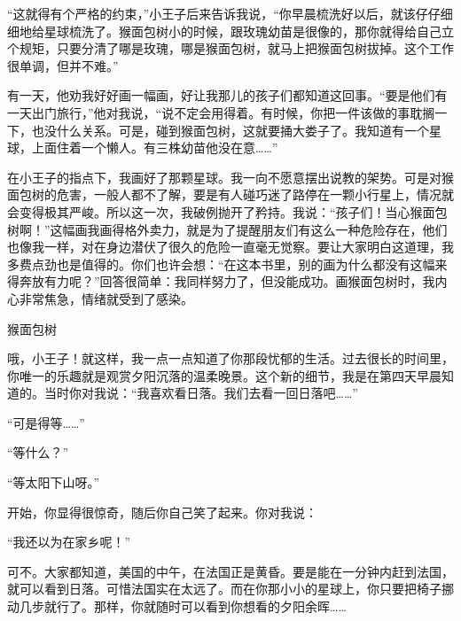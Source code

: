 “这就得有个严格的约束，”小王子后来告诉我说，“你早晨梳洗好以后，就该仔仔细细地给星球梳洗了。猴面包树小的时候，跟玫瑰幼苗是很像的，那你就得给自己立个规矩，只要分清了哪是玫瑰，哪是猴面包树，就马上把猴面包树拔掉。这个工作很单调，但并不难。”

有一天，他劝我好好画一幅画，好让我那儿的孩子们都知道这回事。“要是他们有一天出门旅行，”他对我说，“说不定会用得着。有时候，你把一件该做的事耽搁一下，也没什么关系。可是，碰到猴面包树，这就要捅大娄子了。我知道有一个星球，上面住着一个懒人。有三株幼苗他没在意\ldots{}\ldots{}”

在小王子的指点下，我画好了那颗星球。我一向不愿意摆出说教的架势。可是对猴面包树的危害，一般人都不了解，要是有人碰巧迷了路停在一颗小行星上，情况就会变得极其严峻。所以这一次，我破例抛开了矜持。我说：“孩子们！当心猴面包树啊！”这幅画我画得格外卖力，就是为了提醒朋友们有这么一种危险存在，他们也像我一样，对在身边潜伏了很久的危险一直毫无觉察。要让大家明白这道理，我多费点劲也是值得的。你们也许会想：“在这本书里，别的画为什么都没有这幅来得奔放有力呢？”回答很简单：我同样努力了，但没能成功。画猴面包树时，我内心非常焦急，情绪就受到了感染。

{\startalignment[center]
 \stopalignment}

猴面包树


\stoptitle

\starttitle[title={6},reference={part0008.html_a009}]

{\startalignment[center]
 \stopalignment}

哦，小王子！就这样，我一点一点知道了你那段忧郁的生活。过去很长的时间里，你唯一的乐趣就是观赏夕阳沉落的温柔晚景。这个新的细节，我是在第四天早晨知道的。当时你对我说：“我喜欢看日落。我们去看一回日落吧\ldots{}\ldots{}”

“可是得等\ldots{}\ldots{}”

“等什么？”

“等太阳下山呀。”

开始，你显得很惊奇，随后你自己笑了起来。你对我说：

“我还以为在家乡呢！”

可不。大家都知道，美国的中午，在法国正是黄昏。要是能在一分钟内赶到法国，就可以看到日落。可惜法国实在太远了。而在你那小小的星球上，你只要把椅子挪动几步就行了。那样，你就随时可以看到你想看的夕阳余晖\ldots{}\ldots{}

